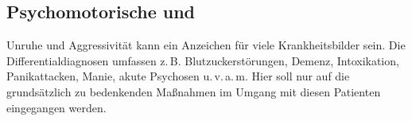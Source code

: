 
% 
% 

% 
% 
% 
% 
% 
% 
% 
% 


\subsection{Psychomotorische  und }

\Text
{{\TxBeschreibung}}%
{%
Unruhe und Aggressivität kann ein Anzeichen für viele
Krankheitsbilder sein. Die Differentialdiagnosen umfassen
z.\,B. Blutzuckerstörungen, Demenz, Intoxikation,
Panikattacken, Manie, akute Psychosen u.\,v.\,a.\,m. Hier soll nur
auf die grundsätzlich zu bedenkenden Maßnahmen im Umgang mit diesen Patienten
eingegangen werden. 
}%


